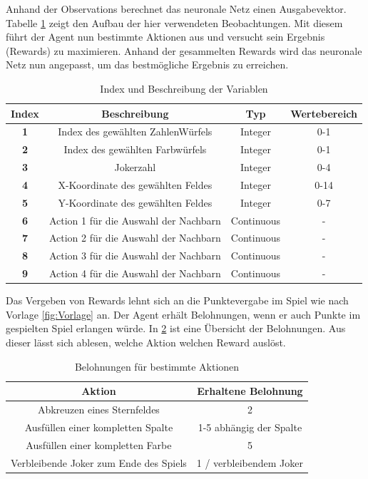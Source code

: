 Anhand der Observations berechnet das neuronale Netz einen Ausgabevektor. Tabelle \ref{tab:Aktionbuffer} zeigt den Aufbau der hier verwendeten Beobachtungen. Mit diesem führt der Agent nun bestimmte Aktionen aus und versucht sein Ergebnis (Rewards) zu maximieren.
Anhand der gesammelten Rewards wird das neuronale Netz nun angepasst, um das bestmögliche Ergebnis zu erreichen.

\begin{table}[!h]
    \centering
    \caption{Index und Beschreibung der Variablen}
    \begin{tabular}{|c|c|c|c|}
    \hline
    \textbf{Index} & \textbf{Beschreibung} & \textbf{Typ} & \textbf{Wertebereich} \\
    \hline
    \textbf{1} & Index des gewählten ZahlenWürfels & Integer & 0-1 \\
    \hline
    \textbf{2} & Index des gewählten Farbwürfels & Integer & 0-1 \\
    \hline
    \textbf{3} & Jokerzahl & Integer & 0-4 \\
    \hline
    \textbf{4} & X-Koordinate des gewählten Feldes & Integer & 0-14 \\
    \hline
    \textbf{5} & Y-Koordinate des gewählten Feldes & Integer & 0-7 \\
    \hline
    \textbf{6} &  Action 1 für die Auswahl der Nachbarn & Continuous & - \\
    \hline
    \textbf{7} &  Action 2 für die Auswahl der Nachbarn & Continuous & - \\
    \hline
    \textbf{8} &  Action 3 für die Auswahl der Nachbarn & Continuous & - \\
    \hline
    \textbf{9} &  Action 4 für die Auswahl der Nachbarn & Continuous & - \\
    \hline
    \end{tabular}
    \label{tab:Aktionbuffer}
\end{table}

Das Vergeben von Rewards lehnt sich an die Punktevergabe im Spiel wie nach Vorlage \ref{fig:Vorlage} an. Der Agent erhält Belohnungen, wenn er auch Punkte im gespielten Spiel erlangen würde. In \ref{tab:rewards} ist eine Übersicht der Belohnungen. Aus dieser lässt sich ablesen, welche Aktion welchen Reward auslöst.

\begin{table}[htbp]
    \centering
    \begin{tabular}{|c|c|}
    \hline
    \textbf{Aktion} & \textbf{Erhaltene Belohnung} \\
    \hline
    Abkreuzen eines Sternfeldes & 2 \\
    Ausfüllen einer kompletten Spalte & 1-5 abhängig der Spalte\\
    Ausfüllen einer kompletten Farbe & 5 \\
    Verbleibende Joker zum Ende des Spiels & 1 / verbleibendem Joker \\
    \hline
    \end{tabular}
    \caption{Belohnungen für bestimmte Aktionen}
    \label{tab:rewards}
\end{table}



